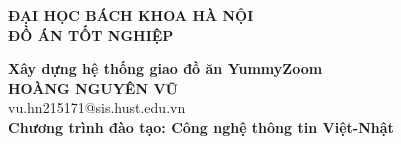 \documentclass[DoAn.tex]{subfiles}
\begin{document}
\begin{titlepage}
\thispagestyle{empty}
\begin{center}

{\textbf{\large{ĐẠI HỌC BÁCH KHOA HÀ NỘI}}}\\[4cm]

{\textbf{\huge{ĐỒ ÁN TỐT NGHIỆP}}}\\[1cm]
{\textbf{\Large{Xây dựng hệ thống giao đồ ăn YummyZoom}}\\[1cm]

{\textbf{\large{HOÀNG NGUYÊN VŨ}}}\\
{\large{vu.hn215171@sis.hust.edu.vn}}\\[0.5cm]

{\textbf{\large{Chương trình đào tạo: Công nghệ thông tin Việt-Nhật
}}}\\

\vspace{2cm}
\begin{table}[H]
\centering
{}
\end{table}}
\end{center}



\end{titlepage}
\end{document}
